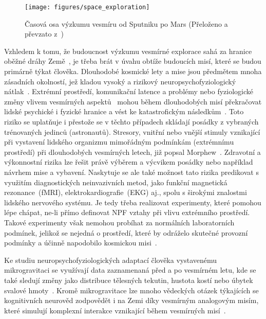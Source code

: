 \begin{figure}[!htb]
    \begin{center}
        \texttt{[image: figures/space\_exploration]}
        \caption{Časová osa výzkumu vesmíru od Sputniku po Mars (Přeloženo a
            převzato z~\cite{bartu})}
        \label{fig:space_exploration}
    \end{center}
\end{figure}

Vzhledem k tomu, že budoucnost výzkumu vesmírné explorace sahá za hranice oběžné
dráhy Země~\cite{salotti2014roadmap,viscio2014methodology}, je třeba brát v
úvahu obtíže budoucích misí, které se budou primárně týkat člověka. Dlouhodobé
kosmické lety a mise jsou předmětem mnoha zásadních okolností, jež kladou vysoký
a rizikový neuropsychofyziologický nátlak~\cite{Mogilever2018}. Extrémní
prostředí, komunikační latence a problémy nebo fyziologické změny vlivem
vesmírných aspektů~\cite{Buguet2007,Williams2009,Roy2021} mohou během
dlouhodobých misí překračovat lidské psychické i fyzické hranice a vést ke
katastrofickým následkům~\cite{Strangman2014,Mogilever2018}. Toto riziko se
uplatňuje i přestože se v těchto případech skládají posádky z vybraných
trénovaných jedinců (astronautů). Stresory, vnitřní nebo vnější stimuly
vznikající při vystavení lidského organizmu mimořádným podmínkám (extrémnímu
prostředí) při dlouhodobých vesmírných letech, již popsal
Morphew~\cite{morphew2001psychological}. Zdravotní a výkonnostní rizika lze
řešit právě výběrem a výcvikem posádky nebo například návrhem mise a vybavení.
Naskytuje se ale také možnost tato rizika predikovat s využitím diagnostických
neinvazivních metod, jako funkční magnetická rezonance~(\gls{fMRI}),
elektrokardiografie~(\gls{EKG}) aj., spolu s širokými znalostmi lidského
nervového systému. Je tedy třeba realizovat experimenty, které pomohou lépe
chápat, ne-li přímo definovat NPF vztahy při vlivu extrémního prostředí. Takové
experimenty však nemohou probíhat za normálních laboratorních podmínek, jelikož
se nejedná o prostředí, které by odráželo skutečné provozní podmínky a účinně
napodobilo kosmickou misi~\cite{Mogilever2018,Pagel2016}.

Ke studiu neuropsychofyziologických adaptací člověka vystavenému mikrogravitaci
se využívají data zaznamenaná před a po vesmírném letu, kde se také sledují
změny jako distribuce tělesných tekutin, hustota kostí nebo úbytek svalové
hmoty~\cite{Stein2012WeightMA}. Kromě mikrogravitace lze mnoho vědeckých otázek
týkajících se kognitivních neurověd zodpovědět i na Zemi díky vesmírným
analogovým misím, které simulují komplexní interakce vznikající během vesmírných
misí~\cite{Pagel2016,Mogilever2018}.

